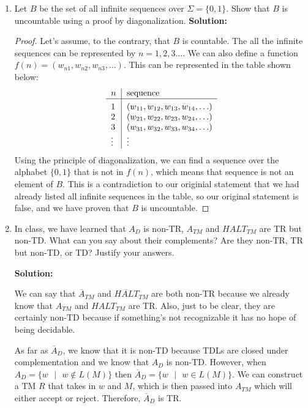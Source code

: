 \documentclass[11pt]{article}
\begin{document}
\begin{enumerate}
\item Let $B$ be the set of all infinite sequences over $\Sigma = \{0,1\}$.  Show that $B$ is uncountable using a proof by diagonalization.  
\textbf{Solution: }
\begin{proof}

Let's assume, to the contrary, that $B$ is countable.  The all the infinite sequences can be represented by $n = 1,2,3 \ldots$.  We can also define a function $f(n) = (w_{n1}, w_{n2}, w_{n3}, \ldots )$.  This can be represented in the table shown below:
\[
    \begin{tabular}{>{$}l<{$}|*{6}{>{$}l<{$}}}
    n   & \text{sequence}   \\
    \hline\vrule height 12pt width 0pt
    1      & (w_{11}, w_{12}, w_{13}, w_{14}, \ldots)    \\
    2      & (w_{21}, w_{22}, w_{23}, w_{24}, \ldots)    \\
    3      & (w_{31}, w_{32}, w_{33}, w_{34}, \ldots)    \\
    \vdots & \vdots                                      \\
    \end{tabular} 
\]
Using the principle of diagonalization, we can find a sequence over the alphabet $\{0,1\}$ that is not in $f(n)$, which means that sequence is not an element of $B$.  This is a contradiction to our originial statement that we had already listed all infinite sequences in the table, so our original statement is false, and we have proven that $B$ is uncountable.  

\end{proof}

\item In class, we have learned that $A_D$ is non-TR, $A_{TM}$ and $HALT_{TM}$ are TR but non-TD. What can you say about their complements? Are they non-TR, TR but non-TD, or TD? Justify your answers.

\textbf{Solution: }

We can say that $\overline{A}_{TM}$ and $\overline{HALT}_{TM}$ are both non-TR because we already know that $A_{TM}$ and $HALT_{TM}$ are TR.  Also, just to be clear, they are certainly non-TD because if something's not recognizable it has no hope of being decidable.  

As far as $\overline{A}_D$, we know that it is non-TD because TDLs are closed under complementation and we know that $A_D$ is non-TD.  However, when $A_D = \{ w\text{ }|\text{ }w \not \in L(M) \}$ then $\overline{A}_D = \{ w\text{ }|\text{ }w \in L(M) \}$.  We can construct a TM $R$ that takes in $w$ and $M$, which is then passed into $A_{TM}$ which will either accept or reject.  Therefore, $\overline{A}_D$ is TR.  


\end{enumerate}
\end{document}
